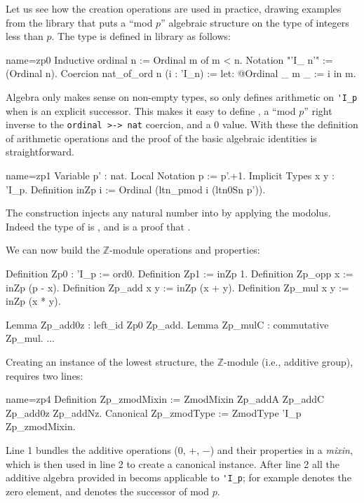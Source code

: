 Let us see how the creation operations are used in practice, drawing
examples from the  library that puts a ``mod $p$'' algebraic
structure on the type  of integers less than $p$.
The  type is defined in library  as follows:

\begin{coq}{name=zp0}{}
Inductive ordinal n := Ordinal m of m < n.
Notation "'I_ n'" := (Ordinal n).
Coercion nat_of_ord n (i : 'I_n) := let: @Ordinal _ m _ := i in m.
\end{coq}

Algebra only makes sense on non-empty types, so  only defines
arithmetic on \lstinline/'I_p/ when  is an explicit successor.
This makes it easy to define , a ``mod $p$'' right inverse to
the \lstinline/ordinal >-> nat/ coercion, and a 0 value. With these
the definition of arithmetic operations and the proof of the basic
algebraic identities is straightforward.

\begin{coq}{name=zp1}{}
Variable p' : nat.
Local Notation p := p'.+1.
Implicit Types x y : 'I_p.
Definition inZp i := Ordinal (ltn_pmod i (ltn0Sn p')).
\end{coq}
The  construction injects any natural number 
into  by applying the modolus.  Indeed the
type of  is ,
and  is a proof that .

We can now build the $\mathbb{Z}$-module operations and
properties:

\begin{coq}{}{}
Definition Zp0 : 'I_p := ord0.
Definition Zp1 := inZp 1.
Definition Zp_opp x := inZp (p - x).
Definition Zp_add x y := inZp (x + y).
Definition Zp_mul x y := inZp (x * y).

Lemma Zp_add0z : left_id Zp0 Zp_add.
Lemma Zp_mulC : commutative Zp_mul.
...
\end{coq}

Creating an instance of the lowest  structure, the
$\mathbb{Z}$-module (i.e., additive group), requires two lines:

\begin{coq}{name=zp4}{}
Definition Zp_zmodMixin := ZmodMixin Zp_addA Zp_addC Zp_add0z Zp_addNz.
Canonical Zp_zmodType := ZmodType 'I_p Zp_zmodMixin.
\end{coq}

Line 1 bundles the additive operations (0, $+$, $-$) and their
properties in a \emph{mixin}, which is then used in line 2 to create a
canonical instance. After line 2 all the additive algebra provided in
 becoms applicable to \lstinline/'I_p/; for example 
denotes the zero element, and  denotes the successor of  mod $p$.

